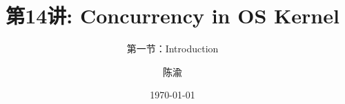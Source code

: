 


\title[第14讲]{第14讲: Concurrency in OS Kernel} %
\subtitle{第一节：Introduction}
\author{陈渝} %
\date{\today} %





\begin{frame}
\titlepage %
\end{frame}
    
%
%

